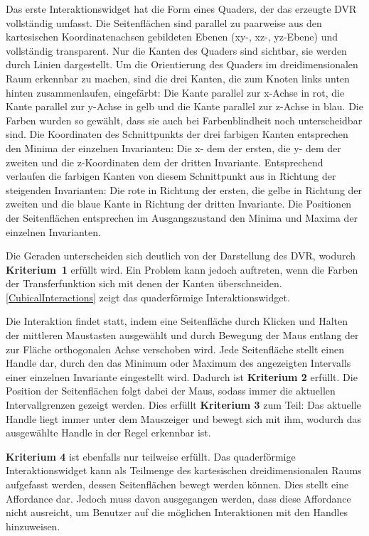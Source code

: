 \documentclass[a4paper,fontsize=12pt,toc=bib,parskip=half,ngerman]{scrartcl}
\begin{document}
Das erste Interaktionswidget hat die Form eines Quaders, der das erzeugte DVR vollst\"andig umfasst. Die Seitenfl\"achen sind parallel zu paarweise aus den kartesischen Koordinatenachsen gebildeten Ebenen (xy-, xz-, yz-Ebene) und vollst\"andig transparent. Nur die Kanten des Quaders sind sichtbar, sie werden durch Linien dargestellt. Um die Orientierung des Quaders im dreidimensionalen Raum erkennbar zu machen, sind die drei Kanten, die zum Knoten links unten hinten zusammenlaufen, eingef\"arbt: Die Kante parallel zur x-Achse in rot, die Kante parallel zur y-Achse in gelb und die Kante parallel zur z-Achse in blau. Die Farben wurden so gew\"ahlt, dass sie auch bei Farbenblindheit noch unterscheidbar sind. Die Koordinaten des Schnittpunkts der drei farbigen Kanten entsprechen den Minima der einzelnen Invarianten: Die x- dem der ersten, die y- dem der zweiten und die z-Koordinaten dem der dritten Invariante. Entsprechend verlaufen die farbigen Kanten von diesem Schnittpunkt aus in Richtung der steigenden Invarianten: Die rote in Richtung der ersten, die gelbe in Richtung der zweiten und die blaue Kante in Richtung der dritten Invariante. Die Positionen der Seitenfl\"achen entsprechen im Ausgangszustand den Minima und Maxima der einzelnen Invarianten. 

Die Geraden unterscheiden sich deutlich von der Darstellung des DVR, wodurch \textbf{Kriterium~1} erf\"ullt wird. Ein Problem kann jedoch auftreten, wenn die Farben der Transferfunktion sich mit denen der Kanten \"uberschneiden. \cref{CubicalInteractions} zeigt das quaderf\"ormige Interaktionswidget.

Die Interaktion findet statt, indem eine Seitenfl\"ache durch Klicken und Halten der mittleren Maustasten ausgew\"ahlt und durch Bewegung der Maus entlang der zur Fl\"ache orthogonalen Achse verschoben wird. Jede Seitenfl\"ache stellt einen Handle dar, durch den das Minimum oder Maximum des angezeigten Intervalls einer einzelnen Invariante eingestellt wird. Dadurch ist \textbf{Kriterium 2} erf\"ullt. Die Position der Seitenfl\"achen folgt dabei der Maus, sodass immer die aktuellen Intervallgrenzen gezeigt werden. Dies erf\"ullt \textbf{Kriterium 3} zum Teil: Das aktuelle Handle liegt immer unter dem Mauszeiger und bewegt sich mit ihm, wodurch das ausgew\"ahlte Handle in der Regel erkennbar ist. 

\textbf{Kriterium 4} ist ebenfalls nur teilweise erf\"ullt. Das quaderf\"ormige Interaktionswidget kann als Teilmenge des kartesischen dreidimensionalen Raums aufgefasst werden, dessen Seitenfl\"achen bewegt werden k\"onnen. Dies stellt eine Affordance dar. Jedoch muss davon ausgegangen werden, dass diese Affordance nicht ausreicht, um Benutzer auf die m\"oglichen Interaktionen mit den Handles hinzuweisen. 
\end{document}
